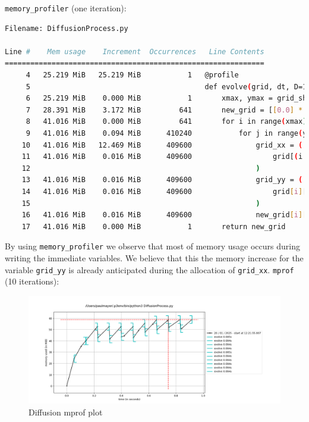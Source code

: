 \documentclass[a4paper,12pt]{article}
\begin{document}
\verb|memory_profiler| (one iteration):
\begin{lstlisting}[language=bash,basicstyle=\tiny\ttfamily]
Filename: DiffusionProcess.py

Line #    Mem usage    Increment  Occurrences   Line Contents
=============================================================
     4   25.219 MiB   25.219 MiB           1   @profile
     5                                         def evolve(grid, dt, D=1.0):
     6   25.219 MiB    0.000 MiB           1       xmax, ymax = grid_shape
     7   28.391 MiB    3.172 MiB         641       new_grid = [[0.0] * ymax for x in range(xmax)]
     8   41.016 MiB    0.000 MiB         641       for i in range(xmax):
     9   41.016 MiB    0.094 MiB      410240           for j in range(ymax):
    10   41.016 MiB   12.469 MiB      409600               grid_xx = (
    11   41.016 MiB    0.016 MiB      409600                   grid[(i + 1) % xmax][j] + grid[(i - 1) % xmax][j] - 2.0 * grid[i][j]
    12                                                     )
    13   41.016 MiB    0.016 MiB      409600               grid_yy = (
    14   41.016 MiB    0.016 MiB      409600                   grid[i][(j + 1) % ymax] + grid[i][(j - 1) % ymax] - 2.0 * grid[i][j]
    15                                                     )
    16   41.016 MiB    0.016 MiB      409600               new_grid[i][j] = grid[i][j] + D * (grid_xx + grid_yy) * dt
    17   41.016 MiB    0.000 MiB           1       return new_grid
\end{lstlisting}\vspace{1em}

By using \verb|memory_profiler| we observe that most of memory usage occurs during writing the immediate variables. 
We believe that this the memory increase for the variable \verb|grid_yy| is already anticipated during the allocation
of \verb|grid_xx|. 
\verb|mprof| (10 iterations):
\begin{figure}[h!]
  \centering
  \includegraphics[width=\textwidth]{images/diffusion_mprofile}
  \caption{Diffusion mprof plot}
  \label{fig:diffusion-mprof}
\end{figure}
\end{document}

